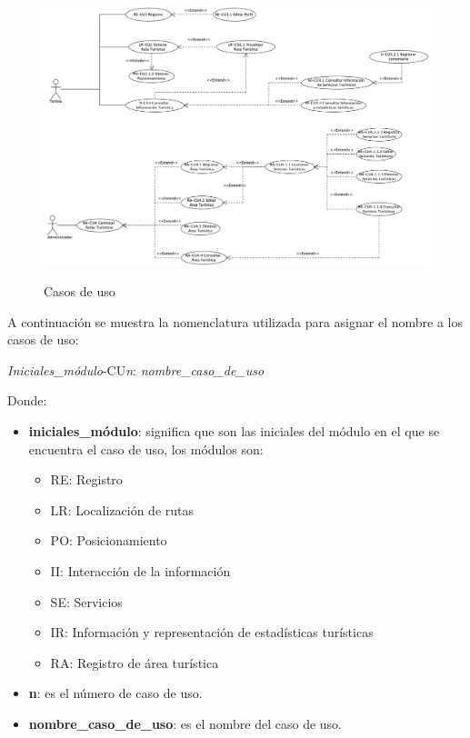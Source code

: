 \hypertarget{fig:casosDeUso}{
	\begin{figure}[htbp]
		\begin{center}
			\hypertarget{fig:casosDeUso}{
				\includegraphics[angle=90, scale=.4]{casosDeUso/images/casosDeUso}
				\caption{Casos de uso}
			}
			\label{fig:casosDeUso}
		\end{center}
	\end{figure}
}

\newpage
A continuación se muestra la nomenclatura utilizada para asignar el nombre a los casos de uso:

\begin{center}
	\Huge{\textit{Iniciales\_módulo}-CU\textit{n}: \textit{nombre\_caso\_de\_uso}}
\end{center}

Donde: 

\begin{itemize}
	\item \textbf{iniciales\_módulo}: significa que son las iniciales del módulo en el que se encuentra el caso de uso, los módulos son: 
	\begin{itemize}
		\item RE: Registro
		\item LR: Localización de rutas
		\item PO: Posicionamiento
		\item II: Interacción de la información
		\item SE: Servicios
		\item IR: Información y representación de estadísticas turísticas
		\item RA: Registro de área turística
	\end{itemize}

	\item \textbf{n}: es el número de caso de uso.
	
	\item \textbf{nombre\_caso\_de\_uso}: es el nombre del caso de uso.
\end{itemize}

